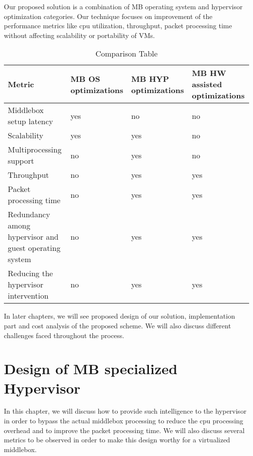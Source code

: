 \documentclass[a4paper,11pt]{report}
\begin{document}
Our proposed solution is a combination of MB operating system and hypervisor optimization categories. Our technique focuses on improvement of the performance metrics like cpu utilization, throughput, packet processing time without affecting scalability or portability of VMs.

\begin{table}[H]
\centering
\begin{tabular}{ | L{6.0cm} | C{2.5cm} | C{2.5cm} | C{2.5cm} | }
\hline
{\textbf {Metric}} & {\textbf {MB OS optimizations}} & {\textbf {MB HYP optimizations}} & {\textbf {MB HW assisted optimizations}}\\ %
\hline
\hline
{Middlebox setup latency} & {yes} & {no} & {no} \\ %
\hline
{Scalability}&{yes}&{yes}&{no}\\ %
\hline
{Multiprocessing support}&{no}&{yes}&{no}\\ %
\hline
{Throughput}&{no}&{yes}&{yes}\\ %
\hline
{Packet processing time}&{no}&{yes}&{yes}\\ %
\hline
{Redundancy among hypervisor and guest operating system}&{no}&{yes}&{yes}\\ %
\hline
{Reducing the hypervisor intervention} & {no} & {yes} & {yes} \\ %
\hline

\end{tabular}
\caption{Comparison Table}
\end{table}

\bigskip
In later chapters, we will see proposed design of our solution, implementation part and cost analysis of the proposed scheme. We will also discuss different challenges faced throughout the process.   

\chapter{Design of MB specialized Hypervisor}
In this chapter, we will discuss how to provide such intelligence to the hypervisor in order to bypass the actual middlebox processing to reduce the cpu processing overhead and to improve the packet processing time. We will also discuss several metrics to be observed in order to make this design worthy for a virtualized middlebox. 
\end{document}
